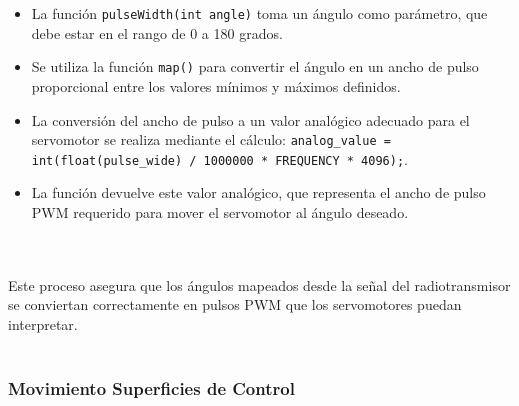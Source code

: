 \begin{itemize}
\item La función \texttt{pulseWidth(int angle)} toma un ángulo como parámetro, que debe estar en el rango de 0 a 180 grados.
\item Se utiliza la función \texttt{map()} para convertir el ángulo en un ancho de pulso proporcional entre los valores mínimos y máximos definidos.
\item La conversión del ancho de pulso a un valor analógico adecuado para el servomotor se realiza mediante el cálculo: \texttt{analog\_value = int(float(pulse\_wide) / 1000000 * FREQUENCY * 4096);}.
\item La función devuelve este valor analógico, que representa el ancho de pulso PWM requerido para mover el servomotor al ángulo deseado.
\end{itemize}
\\ \\
Este proceso asegura que los ángulos mapeados desde la señal del radiotransmisor se conviertan correctamente en pulsos PWM que los servomotores puedan interpretar. \\ \\




\subsubsection{Movimiento Superficies de Control} \\ \\


